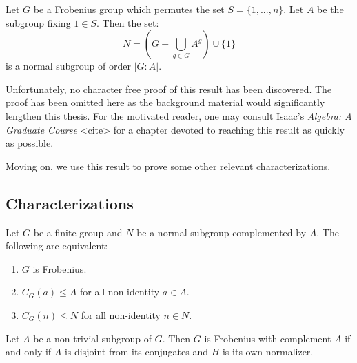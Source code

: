 \documentclass[main.tex]{subfiles}
\begin{document}
\begin{theorem}[Frobenius]
Let $G$ be a Frobenius group which permutes the set $S = \{1,...,n\}$. Let $A$ be the subgroup fixing $1 \in S$. Then the set:
$$N = (G - \bigcup_{g \in G} A^g) \cup \{1\}$$
is a normal subgroup of order $|G : A|$.
\end{theorem}

Unfortunately, no character free proof of this result has been discovered. The proof has been omitted here as the background material would significantly lengthen this thesis. For the motivated reader, one may consult Isaac's \emph{Algebra: A Graduate Course} <cite> for a chapter devoted to reaching this result as quickly as possible.

Moving on, we use this result to prove some other relevant characterizations.

\hss

\subsection{Characterizations}

\hss

\begin{lemma}\label{frobeniuscentralizers}
Let $G$ be a finite group and $N$ be a normal subgroup complemented by $A$. The following are equivalent:
\begin{enumerate}
	\item $G$ is Frobenius.
	\item $C_G(a) \le A$ for all non-identity $a \in A$.
	\item $C_G(n) \le N$ for all non-identity $n \in N$.
\end{enumerate}
\end{lemma}


\begin{lemma}\label{frobeniusnormalizer}
Let $A$ be a non-trivial subgroup of $G$. Then $G$ is Frobenius with complement $A$ if and only if $A$ is disjoint from its conjugates and $H$ is its own normalizer.
\end{lemma}
\end{document}
